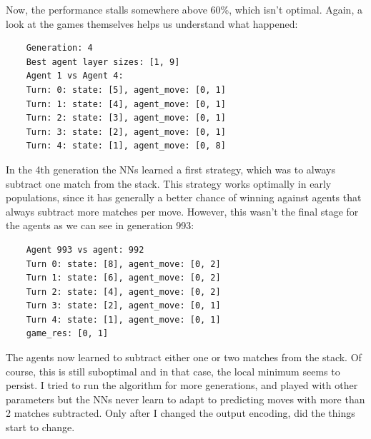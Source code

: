 \documentclass[11pt]{report}
\begin{document}
\begin{enumerate}
\begin{center}
    \end{center}
    Now, the performance stalls somewhere above 60\%, which isn't optimal.
    Again, a look at the games themselves helps us understand what happened:
    \begin{verbatim}
    Generation: 4
    Best agent layer sizes: [1, 9]
    Agent 1 vs Agent 4:
    Turn: 0: state: [5], agent_move: [0, 1]
    Turn: 1: state: [4], agent_move: [0, 1]
    Turn: 2: state: [3], agent_move: [0, 1]
    Turn: 3: state: [2], agent_move: [0, 1]
    Turn: 4: state: [1], agent_move: [0, 8]
    \end{verbatim}
    In the 4th generation the NNs learned a first strategy, which was to always subtract one match from the stack.
    This strategy works optimally in early populations, since it has generally a better chance of winning against agents that always subtract more matches per move.
    However, this wasn't the final stage for the agents as we can see in generation 993:
    \begin{verbatim}
    Agent 993 vs agent: 992
    Turn 0: state: [8], agent_move: [0, 2]
    Turn 1: state: [6], agent_move: [0, 2]
    Turn 2: state: [4], agent_move: [0, 2]
    Turn 3: state: [2], agent_move: [0, 1]
    Turn 4: state: [1], agent_move: [0, 1]
    game_res: [0, 1]
    \end{verbatim}
    The agents now learned to subtract either one or two matches from the stack.
    Of course, this is still suboptimal and in that case, the local minimum seems to persist.
    I tried to run the algorithm for more generations, and played with other parameters but the NNs never learn to adapt to predicting moves with more than 2 matches subtracted.
    Only after I changed the output encoding, did the things start to change.

\end{enumerate}
\end{document}
